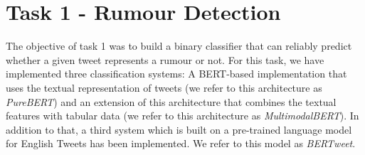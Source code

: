 \documentclass[11pt,a4paper]{article}
\begin{document}
\section{Task 1 - Rumour Detection}
\label{sec:task_1_rumour_detection}
The objective of task 1 was to build a binary classifier that can reliably predict whether a given tweet represents a rumour or not.
\newline
For this task, we have implemented three classification systems: A BERT-based implementation that uses the textual representation of tweets (we refer to this architecture as \textit{PureBERT}) and an extension of this architecture that combines the textual features with tabular data (we refer to this architecture as \textit{MultimodalBERT}).
\newline
In addition to that, a third system which is built on a pre-trained language model for English Tweets \citep{RN683} has been implemented. We refer to this model as \textit{BERTweet}.
\end{document}
